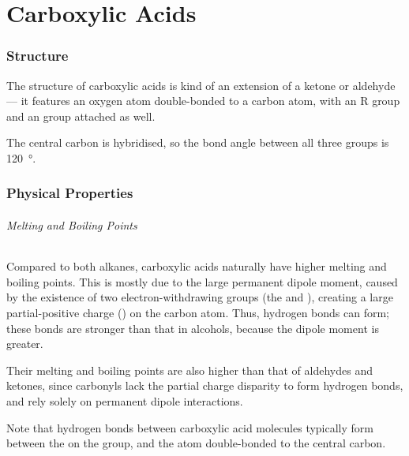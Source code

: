 

\pagebreak
\hypertarget{ChapterCarboxylicAcids}{}
\part{Carboxylic Acids}

	\section{Structure}

		The structure of carboxylic acids is kind of an extension of a ketone or aldehyde –– it features an oxygen atom double-bonded
		to a carbon atom, with an R group and an  group attached as well.


		The central carbon is \sptwo hybridised, so the bond angle between all three groups is \SI{120}{\degree}.


	\section{Physical Properties}

		\paragraph{Melting and Boiling Points}

		Compared to both alkanes, carboxylic acids naturally have higher melting and boiling points. This is mostly due to the large permanent
		dipole moment, caused by the existence of two electron-withdrawing groups (the  and ), creating a large partial-positive
		charge (\deltap) on the carbon atom. Thus, hydrogen bonds can form; these bonds are stronger than that in alcohols, because the dipole
		moment is greater.

		Their melting and boiling points are also higher than that of aldehydes and ketones, since carbonyls lack the  partial charge
		disparity to form hydrogen bonds, and rely solely on permanent dipole interactions.

		Note that hydrogen bonds between carboxylic acid molecules typically form between the  on the  group, and the  atom
		double-bonded to the central carbon.

